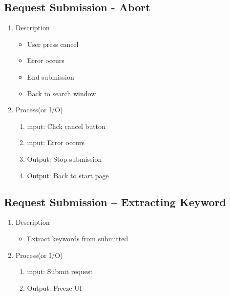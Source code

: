 \documentclass[conference]{IEEEtran}
\begin{document}
\subsection{Request Submission - Abort}
\begin{enumerate}
\item Description
   \begin{itemize}
  \item User press cancel
  \item Error occurs
  \item End submission
  \item Back to search window 
\end{itemize}
\item Process(or I/O)
  \begin{enumerate}
     \item input: Click cancel button
     \item input: Error occurs 
     \item Output: Stop submission
     \item Output: Back to start page
  \end{enumerate}
\end{enumerate}
\textit{}

\subsection{Request Submission – Extracting Keyword}
\begin{enumerate}
\item Description
\begin{itemize}
  \item Extract keywords from submitted  
\end{itemize}
\item Process(or I/O)
  \begin{enumerate}
     \item input: Submit request 
     \item Output: Freeze UI
  \end{enumerate}
\end{enumerate}
\textit{}
\end{document}
